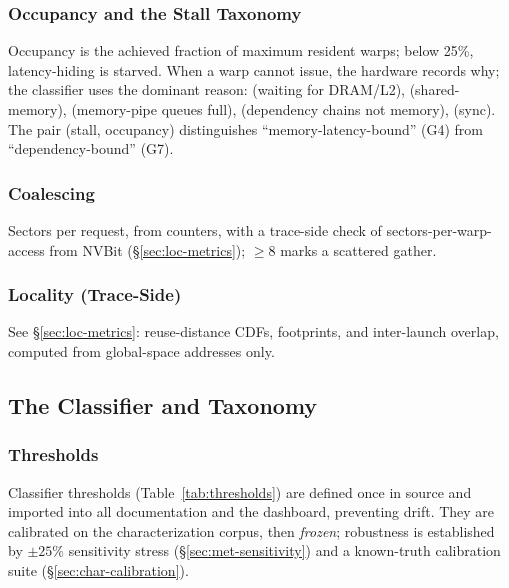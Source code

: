 \subsubsection{Occupancy and the Stall Taxonomy}
Occupancy is the achieved fraction of maximum resident warps; below 25\%, latency-hiding is starved. When a warp cannot issue, the hardware records why; the classifier uses the dominant reason:  (waiting for DRAM/L2),  (shared-memory),  (memory-pipe queues full),  (dependency chains not memory),  (sync). The pair (stall, occupancy) distinguishes ``memory-latency-bound'' (G4) from ``dependency-bound'' (G7).

\subsubsection{Coalescing}
Sectors per request, from counters, with a trace-side check of sectors-per-warp-access from NVBit (\S\ref{sec:loc-metrics}); $\geq 8$ marks a scattered gather.

\subsubsection{Locality (Trace-Side)}
See \S\ref{sec:loc-metrics}: reuse-distance CDFs, footprints, and inter-launch overlap, computed from global-space addresses only.

\subsection{The Classifier and Taxonomy}
\label{sec:met-tree}

\subsubsection{Thresholds}
Classifier thresholds (Table~\ref{tab:thresholds}) are defined once in source and imported into all documentation and the dashboard, preventing drift. They are calibrated on the characterization corpus, then \emph{frozen}; robustness is established by $\pm 25\%$ sensitivity stress (\S\ref{sec:met-sensitivity}) and a known-truth calibration suite (\S\ref{sec:char-calibration}).

